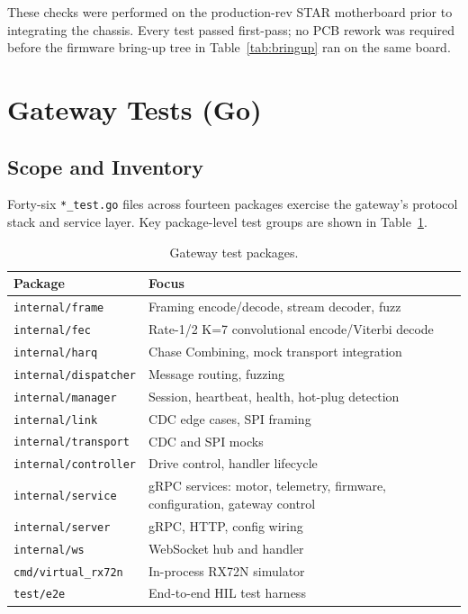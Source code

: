 \documentclass[11pt,letterpaper]{article}
\begin{document}
These checks were performed on the production-rev STAR motherboard
prior to integrating the chassis. Every test passed first-pass; no
PCB rework was required before the firmware bring-up tree in
Table~\ref{tab:bringup} ran on the same board.

\section{Gateway Tests (Go)}
\label{sec:gw}

\subsection{Scope and Inventory}
Forty-six \texttt{*\_test.go} files across fourteen packages exercise
the gateway's protocol stack and service layer. Key package-level
test groups are shown in Table~\ref{tab:gw-packages}.

\begin{table}[H]
\centering
\caption{Gateway test packages.}
\label{tab:gw-packages}
\small
\begin{tabularx}{\linewidth}{l X}
\toprule
\textbf{Package} & \textbf{Focus} \\
\midrule
\texttt{internal/frame}      & Framing encode/decode, stream decoder, fuzz \\
\texttt{internal/fec}        & Rate-1/2 K=7 convolutional encode/Viterbi decode \\
\texttt{internal/harq}       & Chase Combining, mock transport integration \\
\texttt{internal/dispatcher} & Message routing, fuzzing \\
\texttt{internal/manager}    & Session, heartbeat, health, hot-plug detection \\
\texttt{internal/link}       & CDC edge cases, SPI framing \\
\texttt{internal/transport}  & CDC and SPI mocks \\
\texttt{internal/controller} & Drive control, handler lifecycle \\
\texttt{internal/service}    & gRPC services: motor, telemetry, firmware,
                               configuration, gateway control \\
\texttt{internal/server}     & gRPC, HTTP, config wiring \\
\texttt{internal/ws}         & WebSocket hub and handler \\
\texttt{cmd/virtual\_rx72n}  & In-process RX72N simulator \\
\texttt{test/e2e}            & End-to-end HIL test harness \\
\bottomrule
\end{tabularx}
\end{table}
\end{document}
